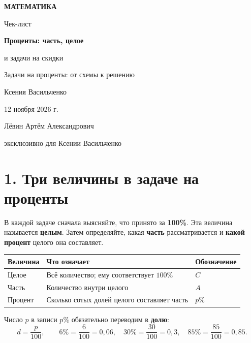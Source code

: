 \documentclass[a4paper,12pt]{article}
\newcommand{\sectionrule}{\par\vspace{-5pt}{\color{accent}\rule{\linewidth}{0.5pt}}\vspace{5pt}}
\newcommand{\ctitle}[1]{\section*{\color{darkaccent}#1}\sectionrule}
\begin{document}
\begin{titlepage}
\thispagestyle{empty}
\begin{center}
\vspace*{21mm}
{\color{darkaccent}\Large\textbf{МАТЕМАТИКА}}\par
\vspace{22mm}
{\fontsize{26}{31}\selectfont Чек-лист}\par
\vspace{10mm}
{\color{accent}\fontsize{21}{26}\selectfont\bfseries Проценты: часть, целое\par и задачи на скидки}\par
\vspace{17mm}
{\large Задачи на проценты: от схемы к решению}\par
\vfill
{\large Ксения Васильченко}\par
\vspace{10mm}
{\normalsize 12 ноября 2026 г.}\par
\vfill
{\small Лёвин Артём Александрович}\par
{\small эксклюзивно для Ксении Васильченко}\par
\vspace{19mm}
\end{center}
\end{titlepage}

\ctitle{1. Три величины в задаче на проценты}
В каждой задаче сначала выясняйте, что принято за \textbf{100\%}. Эта величина называется
\textbf{целым}. Затем определяйте, какая \textbf{часть} рассматривается и \textbf{какой процент}
целого она составляет.

\begin{center}
\renewcommand{\arraystretch}{1.25}
\begin{tabularx}{\linewidth}{@{}p{30mm}Xl@{}}
\toprule
Величина & Что означает & Обозначение\\
\midrule
Целое & Всё количество; ему соответствует $100\%$ & $C$\\
Часть & Количество внутри целого & $A$\\
Процент & Сколько сотых долей целого составляет часть & $p\%$\\
\bottomrule
\end{tabularx}
\end{center}
Число $p$ в записи $p\%$ обязательно переводим в \textbf{долю}:
\[
\boxed{d=\frac{p}{100}},\qquad
6\%=\frac{6}{100}=0{,}06,\quad
30\%=\frac{30}{100}=0{,}3,\quad
85\%=\frac{85}{100}=0{,}85.
\]
\end{document}
